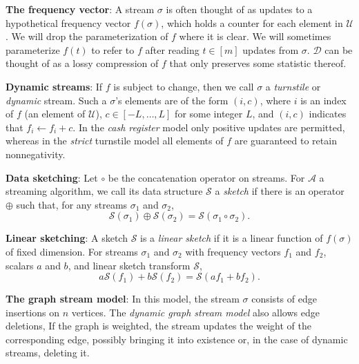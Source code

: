\documentclass{report}
\begin{document}
\noindent
\textbf{The frequency vector}:
A stream $\sigma$ is often thought of as updates to a hypothetical frequency vector $f(\sigma)$, which holds a counter for each element in $\mathcal{U}$.
We will drop the parameterization of $f$ where it is clear.
We will sometimes parameterize $f(t)$ to refer to $f$ after reading $t \in [m]$ updates from $\sigma$.
$\mathcal{D}$ can be thought of as a lossy compression of $f$ that only preserves some statistic thereof.

\noindent
\textbf{Dynamic streams}:
If $f$ is subject to change, then we call $\sigma$ a \emph{turnstile} or \emph{dynamic} stream.
Such a $\sigma$'s elements are of the form $(i, c)$, where $i$ is an index of $f$ (an element of $\mathcal{U}$), $c \in [-L, \dots, L]$ for some integer $L$, and $(i,c)$ indicates that $f_i \gets f_i + c$.
In the \emph{cash register} model only positive updates are permitted, whereas in the \emph{strict} turnstile model all elements of $f$ are guaranteed to retain nonnegativity.

\noindent
\textbf{Data sketching}:
Let $\circ$ be the concatenation operator on streams.
For $\mathcal{A}$ a streaming algorithm, we call its data structure $\mathcal{S}$ a \emph{sketch} if there is an operator $\oplus$ such that, for any streams $\sigma_1$ and $\sigma_2$, 
%
\begin{equation} \label{eq:merge}
\mathcal{S}(\sigma_1) \oplus \mathcal{S}(\sigma_2) = \mathcal{S}(\sigma_1 \circ \sigma_2).
\end{equation}
%

\noindent
\textbf{Linear sketching}:
A sketch $\mathcal{S}$ is a \emph{linear sketch} if it is a linear function of $f(\sigma)$ of fixed dimension.
%
For streams $\sigma_1$ and $\sigma_2$ with frequency vectors $f_1$ and $f_2$, scalars $a$ and $b$, and linear sketch transform $\mathcal{S}$, 
%
\begin{equation} \label{eq:linearity}
a\mathcal{S}(f_1) + b\mathcal{S}(f_2) = \mathcal{S}(af_1 + bf_2).
\end{equation}
%

\noindent
\textbf{The graph stream model}:
In this model, the stream $\sigma$ consists of edge insertions on $n$ vertices. 
The \emph{dynamic graph stream model} also allows edge deletions,
If the graph is weighted, the stream updates the weight of the corresponding edge, possibly bringing it into existence or, in the case of dynamic streams, deleting it.
\end{document}
